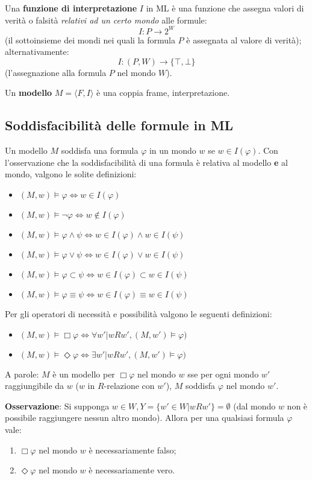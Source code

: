 Una \textbf{funzione di interpretazione} $I$ in ML è una funzione che assegna valori di verità o falsità \textit{relativi ad un certo mondo} alle formule:\\ $$I: P \to 2 ^ W$$ (il sottoinsieme dei mondi nei quali la formula $P$ è assegnata al valore di verità);
alternativamente: $$I: (P, W) \to \lbrace \top, \bot \rbrace$$ (l'assegnazione alla formula $P$ nel mondo $W$).

Un \textbf{modello} $M = \langle F, I \rangle$ è una coppia frame, interpretazione.

\subsection{Soddisfacibilità delle formule in ML}
Un modello $M$ soddisfa una formula $\varphi$ in un mondo $w$ se $w \in I(\varphi)$. Con l'osservazione che la soddisfacibilità di una formula è relativa al modello \textbf{e} al mondo, valgono le solite definizioni:
\begin{itemize}
\item $(M, w) \models \varphi \iff w \in I(\varphi)$
\item $(M, w) \models \lnot \varphi \iff w \not\in I(\varphi)$
\item $(M, w) \models \varphi \land \psi \iff w \in I(\varphi) \land w \in I(\psi)$
\item $(M, w) \models \varphi \lor \psi \iff w \in I(\varphi) \lor w \in I(\psi)$
\item $(M, w) \models \varphi \subset \psi \iff w \in I(\varphi) \subset w \in I(\psi)$
\item $(M, w) \models \varphi \equiv \psi \iff w \in I(\varphi) \equiv w \in I(\psi)$
\end{itemize}
Per gli operatori di necessità e possibilità valgono le seguenti definizioni:
\begin{itemize}
\item $(M, w) \models \Box \varphi \iff \forall w' | wRw', (M, w') \models \varphi)$
\item $(M, w) \models \Diamond \varphi \iff \exists w' | wRw', (M, w') \models \varphi)$
\end{itemize}
A parole: $M$ è un modello per $\Box \varphi$ nel mondo $w$ sse per ogni mondo $w'$ raggiungibile da $w$ ($w$ in $R$-relazione con $w'$), $M$ soddisfa $\varphi$ nel mondo $w'$.

\textbf{Osservazione}: Si supponga $w \in W, Y = \lbrace w' \in W | wRw' \rbrace = \emptyset$ (dal mondo $w$ non è possibile raggiungere nessun altro mondo). Allora per una qualsiasi formula $\varphi$ vale:
\begin{enumerate}
\item $\Box \varphi$ nel mondo $w$ è necessariamente falso;
\item $\Diamond \varphi$ nel mondo $w$ è necessariamente vero.
\end{enumerate}

